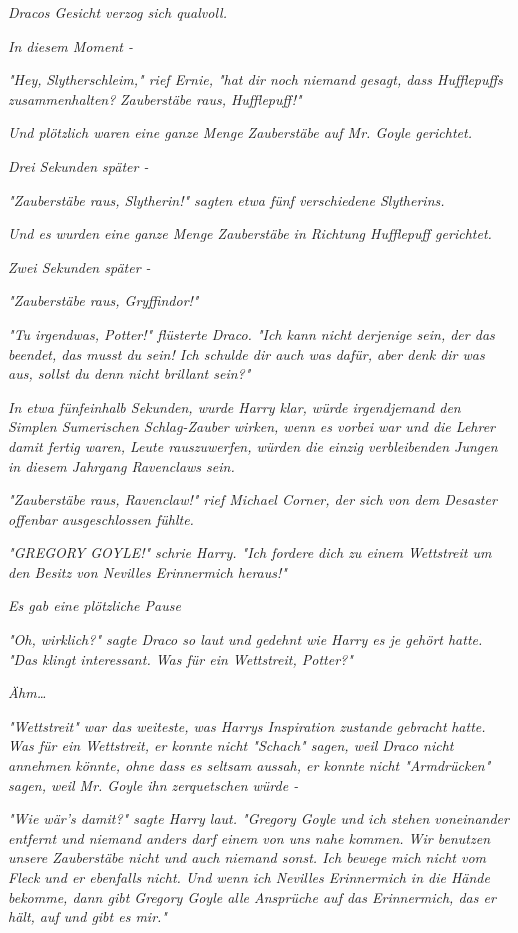 {\emph{Dracos Gesicht verzog sich qualvoll.}

\emph{In diesem Moment -}

\emph{"Hey,} \emph{\emph{Slytherschleim,}" rief Ernie, "hat dir noch niemand gesagt, dass Hufflepuffs zusammenhalten?} \emph{\emph{Zauberstäbe raus, Hufflepuff!}"}

\emph{Und plötzlich waren eine ganze Menge Zauberstäbe auf Mr. Goyle gerichtet.}

\emph{Drei Sekunden später -}

\emph{"\emph{Zauberstäbe raus, Slytherin!}" sagten etwa fünf verschiedene Slytherins.}

\emph{Und es wurden eine ganze Menge Zauberstäbe in Richtung Hufflepuff gerichtet.}

\emph{Zwei Sekunden später -}

\emph{"\emph{Zauberstäbe raus, Gryffindor!}"}

\emph{"\emph{Tu irgendwas, Potter!}" flüsterte Draco. "\emph{Ich kann nicht derjenige sein, der das beendet, das musst du sein! Ich schulde dir auch was dafür, aber denk dir was aus, sollst du denn nicht brillant sein?}"}

\emph{In etwa fünfeinhalb Sekunden, wurde Harry klar, würde irgendjemand den Simplen Sumerischen Schlag-Zauber wirken, wenn es vorbei war und die Lehrer damit fertig waren, Leute rauszuwerfen, würden die einzig verbleibenden Jungen in diesem Jahrgang Ravenclaws sein.}

\emph{"\emph{Zauberstäbe raus, Ravenclaw!}" rief Michael Corner, der sich von dem Desaster offenbar ausgeschlossen fühlte.}

\emph{"\emph{GREGORY GOYLE!}" schrie Harry. "\emph{Ich fordere dich zu einem Wettstreit um den Besitz von Nevilles Erinnermich heraus!}"}

\emph{Es gab eine plötzliche Pause}

\emph{"Oh, wirklich?" sagte Draco so laut und gedehnt wie Harry es je gehört hatte. "Das klingt interessant. Was für ein Wettstreit, Potter?"}

\emph{Ähm…}

\emph{"Wettstreit" war das weiteste, was Harrys Inspiration zustande gebracht} \emph{hatte. Was für ein Wettstreit, er konnte nicht "Schach" sagen, weil Draco nicht annehmen könnte, ohne dass es seltsam aussah, er konnte nicht "Armdrücken" sagen, weil Mr. Goyle ihn zerquetschen würde -}

\emph{"Wie wär's damit?" sagte Harry laut. "Gregory Goyle und ich stehen voneinander entfernt und niemand anders darf einem von uns nahe kommen. Wir benutzen unsere Zauberstäbe nicht und auch niemand sonst. Ich bewege mich nicht vom Fleck und er ebenfalls nicht. Und wenn ich Nevilles Erinnermich in die Hände bekomme, dann gibt Gregory Goyle alle Ansprüche auf das Erinnermich, das er hält, auf und gibt es mir."}

}
